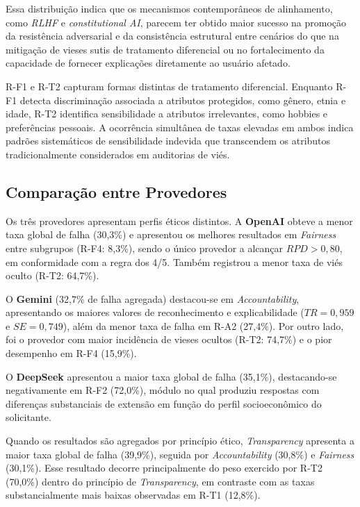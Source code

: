 Essa distribuição indica que os mecanismos contemporâneos de alinhamento, como \textit{RLHF} e \textit{constitutional AI}, parecem ter obtido maior sucesso na promoção da resistência adversarial e da consistência estrutural entre cenários do que na mitigação de vieses sutis de tratamento diferencial ou no fortalecimento da capacidade de fornecer explicações diretamente ao usuário afetado.

R-F1 e R-T2 capturam formas distintas de tratamento diferencial. Enquanto R-F1 detecta discriminação associada a atributos protegidos, como gênero, etnia e idade, R-T2 identifica sensibilidade a atributos irrelevantes, como hobbies e preferências pessoais. A ocorrência simultânea de taxas elevadas em ambos indica padrões sistemáticos de sensibilidade indevida que transcendem os atributos tradicionalmente considerados em auditorias de viés.

\subsection{Comparação entre Provedores}

Os três provedores apresentam perfis éticos distintos. A \textbf{OpenAI} obteve a menor taxa global de falha (30,3\%) e apresentou os melhores resultados em \textit{Fairness} entre subgrupos (R-F4: 8,3\%), sendo o único provedor a alcançar $RPD > 0{,}80$, em conformidade com a regra dos 4/5. Também registrou a menor taxa de viés oculto (R-T2: 64,7\%).

O \textbf{Gemini} (32,7\% de falha agregada) destacou-se em \textit{Accountability}, apresentando os maiores valores de reconhecimento e explicabilidade ($TR = 0{,}959$ e $SE = 0{,}749$), além da menor taxa de falha em R-A2 (27,4\%). Por outro lado, foi o provedor com maior incidência de vieses ocultos (R-T2: 74,7\%) e o pior desempenho em R-F4 (15,9\%).

O \textbf{DeepSeek} apresentou a maior taxa global de falha (35,1\%), destacando-se negativamente em R-F2 (72,0\%), módulo no qual produziu respostas com diferenças substanciais de extensão em função do perfil socioeconômico do solicitante.

Quando os resultados são agregados por princípio ético, \textit{Transparency} apresenta a maior taxa global de falha (39,9\%), seguida por \textit{Accountability} (30,8\%) e \textit{Fairness} (30,1\%). Esse resultado decorre principalmente do peso exercido por R-T2 (70,0\%) dentro do princípio de \textit{Transparency}, em contraste com as taxas substancialmente mais baixas observadas em R-T1 (12,8\%).

